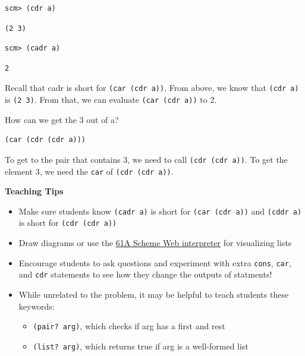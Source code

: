 \begin{lstlisting}
scm> (cdr a)
\end{lstlisting}
\begin{solution}[.25in]
\begin{lstlisting}
(2 3)
\end{lstlisting}
\end{solution}

\begin{lstlisting}
scm> (cadr a)
\end{lstlisting}
\begin{solution}[.25in]
\begin{lstlisting}
2
\end{lstlisting}
Recall that cadr is short for \texttt{(car (cdr a))}. From above, we know that \texttt{(cdr a)} is \texttt{(2 3)}. From that, we can evaluate \texttt{(car (cdr a))} to 2.
\end{solution}

How can we get the 3 out of a?
\begin{solution}[.25in]
\begin{lstlisting}
(car (cdr (cdr a)))
\end{lstlisting}
To get to the pair that contains 3, we need to call \texttt{(cdr (cdr a))}. To get the element 3, we need the \texttt{car} of \texttt{(cdr (cdr a))}.
\end{solution}

\begin{guide}
\begin{blocksection}
\textbf{Teaching Tips}
\begin{itemize}
  \item Make sure students know \lstinline{(cadr a)} is short for \lstinline{(car (cdr a))} and \lstinline{(cddr a)} is short for \lstinline{(cdr (cdr a))}
  \item Draw diagrams or use the \href{https://code.cs61a.org/}{61A Scheme Web interpreter} for visualizing lists
  \item Encourage students to ask questions and experiment with extra \lstinline{cons}, \lstinline{car}, and \lstinline{cdr} statements to see how they change the outputs of statments!
  \item While unrelated to the problem, it may be helpful to teach students these keywords:
  \begin{itemize}
    \item\lstinline{(pair? arg)}, which checks if arg has a first and rest
    \item\lstinline{(list? arg)}, which returns true if arg is a well-formed list
  \end{itemize}
\end{itemize}
\end{blocksection}
\end{guide}